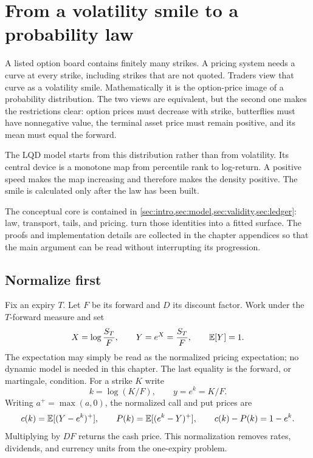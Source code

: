 \section{From a volatility smile to a probability law}
\label{sec:intro}

A listed option board contains finitely many strikes.  A pricing system needs
a curve at every strike, including strikes that are not quoted.  Traders view
that curve as a volatility smile.  Mathematically it is the option-price image
of a probability distribution.  The two views are equivalent, but the second
one makes the restrictions clear: option prices must decrease with strike,
butterflies must have nonnegative value, the terminal asset price must remain
positive, and its mean must equal the forward.

The LQD model starts from this distribution rather than from volatility.  Its
central device is a monotone map from percentile rank to log-return.  A
positive speed makes the map increasing and therefore makes the density
positive.  The smile is calculated only after the law has been built.

The conceptual core is contained in
\cref{sec:intro,sec:model,sec:validity,sec:ledger}: law, transport, tails, and
pricing.   turn those identities
into a fitted surface.  The
proofs and implementation details are collected in the chapter appendices so
that the main argument can be read without interrupting its progression.

\subsection{Normalize first}

Fix an expiry $T$.  Let $F$ be its forward and $D$ its discount factor.  Work
under the $T$-forward measure and set
\begin{equation}
X=\log\frac{S_T}{F},\qquad Y=e^X=\frac{S_T}{F},\qquad \mathbb{E}[Y]=1.
\label{eq:Xdef}
\end{equation}
The expectation may simply be read as the normalized pricing expectation; no
dynamic model is needed in this chapter.  The last equality is the forward,
or martingale, condition.  For a strike $K$ write
\[
k=\log(K/F),\qquad y=e^k=K/F.
\]
Writing $a^+=\max(a,0)$, the normalized call and put prices are
\begin{equation}
c(k)=\mathbb{E}[(Y-e^k)^+],\qquad
P(k)=\mathbb{E}[(e^k-Y)^+],\qquad
c(k)-P(k)=1-e^k.
\label{eq:calldef}
\end{equation}
Multiplying by $DF$ returns the cash price.  This normalization removes rates,
dividends, and currency units from the one-expiry problem.

